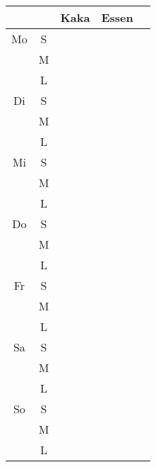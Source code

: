\documentclass[11pt,a4paper]{article}
\begin{document}
\pagestyle{empty}
\centering
\begin{tabular}{c|c|p{3cm}|p{5cm}|p{5cm}}
  \toprule
     &   & Kaka & Essen &   \\
  \midrule
  Mo & S &      &       &   \\
     & M &      &       &   \\
     & L &      &       &   \\
  \midrule
  Di & S &      &       &   \\
     & M &      &       &   \\
     & L &      &       &   \\
  \midrule
  Mi & S &      &       &   \\
     & M &      &       &   \\
     & L &      &       &   \\
  \midrule
  Do & S &      &       &   \\
     & M &      &       &   \\
     & L &      &       &   \\
  \midrule
  Fr & S &      &       &   \\
     & M &      &       &   \\
     & L &      &       &   \\
  \midrule
  Sa & S &      &       &   \\
     & M &      &       &   \\
     & L &      &       &   \\
  \midrule
  So & S &      &       &   \\
     & M &      &       &   \\
     & L &      &       &   \\
  \bottomrule
\end{tabular}
\end{document}

